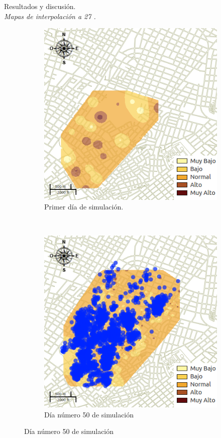 \begin{frame}[t]{Resultados y discusión.\\\textit{Mapas de interpolación a 27 \textcelsius.}}
    \begin{figure}
    \begin{subfigure}[b]{0.45\textwidth}
        \includegraphics[width=\textwidth]{./graphics/temp-27-0.png}
        \caption{ Primer día de simulación.}
    \end{subfigure}
    ~~~~
    \begin{subfigure}[b]{0.45\textwidth}
        \includegraphics[width=\textwidth]{./graphics/temp-27-final.png}
        \caption{Día número 50 de simulación}
    \end{subfigure}
    \end{figure}
\end{frame}

